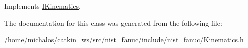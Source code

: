Implements \hyperlink{classIKinematics_ad43b2185f06e20eb0bf9d5a94d4aec18}{I\-Kinematics}.



The documentation for this class was generated from the following file\-:\begin{DoxyCompactItemize}
\item 
/home/michalos/catkin\-\_\-ws/src/nist\-\_\-fanuc/include/nist\-\_\-fanuc/\hyperlink{Kinematics_8h}{Kinematics.\-h}\end{DoxyCompactItemize}
